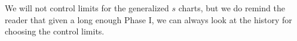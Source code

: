 We will not control limits for the generalized $s$ charts, but we do remind the reader that given a long enough Phase I, we can always look at the history for choosing the control limits. 




%
%

